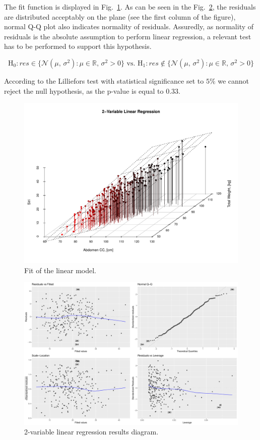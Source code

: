 \documentclass[11pt,american,american]{article}
\begin{document}
The fit function is displayed in Fig.~\ref{fig:3d_linear_regression}. As can be seen in the Fig.~\ref{fig:2var_linear_regression}, the residuals are distributed acceptably on the plane (see the first column of the figure), normal Q-Q plot also indicates normality of residuals. Assuredly, as normality of residuals is the absolute assumption to perform linear regression, a relevant test has to be performed to support this hypothesis.

\begin{equation*}
	\text{H}_{0}: res \in \{ \mathcal{N} (\mu,\,\sigma^{2}): \mu \in \mathbb{R}, \, \sigma^{2} > 0 \} \text{ vs. }
	\text{H}_{1}: res \not\in \{ \mathcal{N} (\mu,\,\sigma^{2}): \mu \in \mathbb{R}, \, \sigma^{2} > 0 \}
\end{equation*}

\medskip

According to the Lilliefors test with statistical significance set to $5\%$ we cannot reject the null hypothesis, as the p-value is equal to $0.33$.

\begin{figure}[H]
	\centering
	\includegraphics[width=0.75\linewidth]{Images/FIGURES/3d_linear_regression}
	\caption{Fit of the linear model.}
	\label{fig:3d_linear_regression}
\end{figure}

\begin{figure}[H]
	\centering
	\includegraphics[width=0.95\linewidth]{Images/FIGURES/2var_linear_regression}
	\caption{2-variable linear regression results diagram.}
	\label{fig:2var_linear_regression}
\end{figure}
\end{document}
